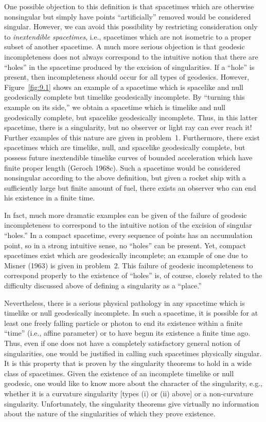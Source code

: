 One possible objection to this definition is that spacetimes which are otherwise
nonsingular but simply have points ``artificially'' removed would be considered
singular. However, we can avoid this possibility by restricting consideration only to
\emph{inextendible spacetimes}, i.e., spacetimes which are not isometric to a proper subset
of another spacetime. A much more serious objection is that geodesic incompleteness
does not always correspond to the intuitive notion that there are ``holes'' in the
spacetime produced by the excision of singularities. If a ``hole'' is present, then
incompleteness should occur for all types of geodesics. However, Figure~\ref{fig:9.1} shows
an example of a spacetime which is spacelike and null geodesically complete but
timelike geodesically incomplete. By ``turning this example on its side,'' we obtain
a spacetime which is timelike and null geodesically complete, but spacelike
geodesically incomplete. Thus, in this latter spacetime, there is a singularity, but no
observer or light ray can ever reach it! Further examples of this nature are given in
problem~1. Furthermore, there exist spacetimes which are timelike, null, and
spacelike geodesically complete, but possess future inextendible timelike curves of
bounded acceleration which have finite proper length (Geroch 1968c). Such a
spacetime would be considered nonsingular according to the above definition, but given
a rocket ship with a sufficiently large but finite amount of fuel, there exists an
observer who can end his existence in a finite time.




In fact, much more dramatic examples can be given of the failure of geodesic
incompleteness to correspond to the intuitive notion of the excision of singular
``holes.'' In a compact spacetime, every sequence of points has an accumulation
point, so in a strong intuitive sense, no ``holes'' can be present. Yet, compact
spacetimes exist which are geodesically incomplete; an example of one due to Misner
(1963) is given in problem~2. This failure of geodesic incompleteness to correspond
properly to the existence of ``holes'' is, of course, closely related to the difficulty
discussed above of defining a singularity as a ``place.''

Nevertheless, there is a serious physical pathology in any spacetime which is
timelike or null geodesically incomplete. In such a spacetime, it is possible for at
least one freely falling particle or photon to end its existence within a finite ``time''
(i.e., affine parameter) or to have begun its existence a finite time ago. Thus, even
if one does not have a completely satisfactory general notion of singularities, one
would be justified in calling such spacetimes physically singular. It is this property
that is proven by the singularity theorems to hold in a wide class of spacetimes.
Given the existence of an incomplete timelike or null geodesic, one would like to
know more about the character of the singularity, e.g., whether it is a curvature
singularity [types (i) or (ii) above] or a non-curvature singularity. Unfortunately, the
singularity theorems give virtually no information about the nature of the singularities
of which they prove existence.
